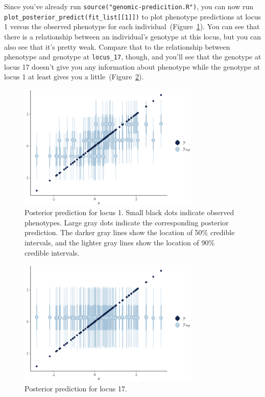 Since you've already run {\tt source("genomic-predicition.R")}, you
can now run {\tt plot\_posterior\_predict(fit\_list[[1]])} to plot
phenotype predictions at locus 1 versus the observed phenotype for
each individual~(Figure~\ref{fig:locus-1}). You can see that there is
a relationship between an individual's genotype at this locus, but you
can also see that it's pretty weak. Compare that to the relationship
between phenotype and genotype at {\tt locus\_17}, though, and you'll
see that the genotype at locus 17 doesn't give you any information
about phenotype while the genotype at locus 1 at least gives you a
little~(Figure~\ref{fig:locus-17}).

\begin{figure}
  \begin{center}
    \includegraphics[height=6cm]{genomic-prediction-locus-1.eps}
  \end{center}
  \caption{Posterior prediction for locus 1. Small black dots indicate
    observed phenotypes. Large gray dots indicate the corresponding
    posterior prediction. The darker gray lines show the location of
    50\% credible intervals, and the lighter gray lines show the
    location of 90\% credible intervals.}\label{fig:locus-1}
\end{figure}

\begin{figure}
  \begin{center}
    \includegraphics[height=6cm]{genomic-prediction-locus-17.eps}
  \end{center}
  \caption{Posterior prediction for locus 17.}\label{fig:locus-17}
\end{figure}

